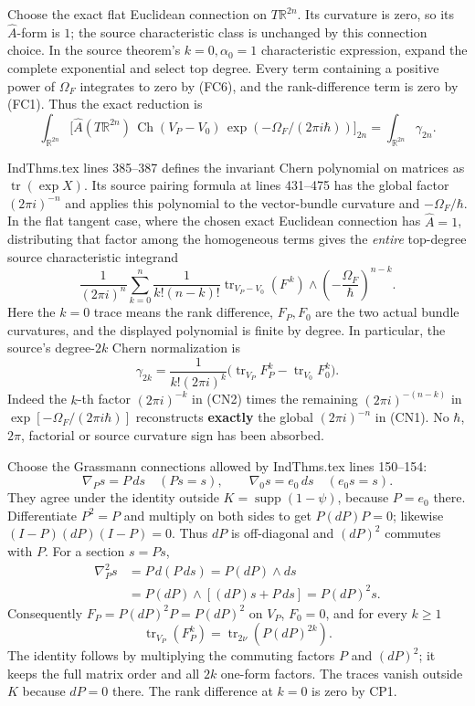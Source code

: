 \documentclass[
  11pt,
]{article}
\begin{document}
Choose the exact flat Euclidean connection on \(T\mathbb R^{2n}\). Its
curvature is zero, so its \(\hat A\)-form is \(1\); the source
characteristic class is unchanged by this connection choice. In the
source theorem's \(k=0,\alpha_0=1\) characteristic expression, expand
the complete exponential and select top degree. Every term containing a
positive power of \(\Omega_F\) integrates to zero by (FC6), and the
rank-difference term is zero by (FC1). Thus the exact reduction is \[
 \int_{\mathbb R^{2n}}
    \bigl[\hat A(T\mathbb R^{2n})\,
       \operatorname{Ch}(V_P-V_0)\,
       \exp(-\Omega_F/(2\pi i\hbar))\bigr]_{2n}
   =\int_{\mathbb R^{2n}}\gamma_{2n}.
 \tag{FC7}
\]

IndThms.tex lines 385--387 defines the invariant Chern polynomial on
matrices as \(\operatorname{tr}(\exp X)\). Its source pairing formula at
lines 431--475 has the global factor \((2\pi i)^{-n}\) and applies this
polynomial to the vector-bundle curvature and \(-\Omega_F/\hbar\). In
the flat tangent case, where the chosen exact Euclidean connection has
\(\hat A=1\), distributing that factor among the homogeneous terms gives
the \emph{entire} top-degree source characteristic integrand \[
 \frac{1}{(2\pi i)^n}
 \sum_{k=0}^{n}
  \frac{1}{k!(n-k)!}
  \operatorname{tr}_{V_P-V_0}(F^{\,k})
       \wedge\left(-\frac{\Omega_F}{\hbar}\right)^{n-k}.
 \tag{CN1}
\] Here the \(k=0\) trace means the rank difference, \(F_P,F_0\) are the
two actual bundle curvatures, and the displayed polynomial is finite by
degree. In particular, the source's degree-\(2k\) Chern normalization is
\[
 \gamma_{2k}
   =\frac{1}{k!(2\pi i)^k}
       \bigl(\operatorname{tr}_{V_P}F_P^k
              -\operatorname{tr}_{V_0}F_0^k\bigr).
 \tag{CN2}
\] Indeed the \(k\)-th factor \((2\pi i)^{-k}\) in (CN2) times the
remaining \((2\pi i)^{-(n-k)}\) in \(\exp[-\Omega_F/(2\pi i\hbar)]\)
reconstructs \textbf{exactly} the global \((2\pi i)^{-n}\) in (CN1). No
\(\hbar\), \(2\pi\), factorial or source curvature sign has been
absorbed.

Choose the Grassmann connections allowed by IndThms.tex lines 150--154:
\[
 \nabla_P s=P\,ds\quad(Ps=s),\qquad
 \nabla_0s=e_0\,ds\quad(e_0s=s).
 \tag{CN3}
\] They agree under the identity outside
\(K=\operatorname{supp}(1-\psi)\), because \(P=e_0\) there.
Differentiate \(P^2=P\) and multiply on both sides to get \(P(dP)P=0\);
likewise \((I-P)(dP)(I-P)=0\). Thus \(dP\) is off-diagonal and
\((dP)^2\) commutes with \(P\). For a section \(s=Ps\), \[
 \begin{aligned}
 \nabla_P^2s
 &=P\,d(P\,ds)
   =P(dP)\wedge ds\\
 &=P(dP)\wedge[(dP)s+P\,ds]
   =P(dP)^2s .
 \end{aligned}
 \tag{CN4}
\] Consequently \(F_P=P(dP)^2P=P(dP)^2\) on \(V_P\), \(F_0=0\), and for
every \(k\ge1\) \[
 \operatorname{tr}_{V_P}(F_P^k)
   =\operatorname{tr}_{2\nu}\!\left(P(dP)^{2k}\right).
 \tag{CN5}
\] The identity follows by multiplying the commuting factors \(P\) and
\((dP)^2\); it keeps the full matrix order and all \(2k\) one-form
factors. The traces vanish outside \(K\) because \(dP=0\) there. The
rank difference at \(k=0\) is zero by CP1.
\end{document}
